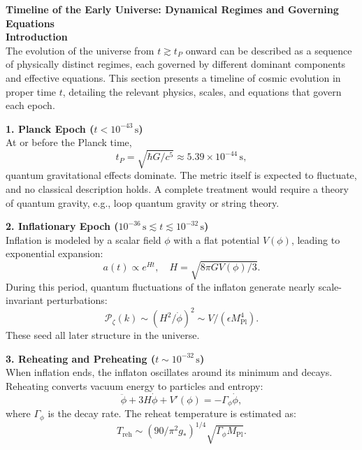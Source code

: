 \begin{technical}
{\Large\textbf{Timeline of the Early Universe: Dynamical Regimes and Governing Equations}}\\[0.4em]

\noindent\textbf{Introduction}\\[0.3em]
The evolution of the universe from \( t \gtrsim t_P \) onward can be described as a sequence of physically distinct regimes, each governed by different dominant components and effective equations. This section presents a timeline of cosmic evolution in proper time \( t \), detailing the relevant physics, scales, and equations that govern each epoch.

\noindent\textbf{1. Planck Epoch \boldmath(\( t < 10^{-43} \, \text{s} \))}\\[0.3em]
At or before the Planck time,
\[
t_P = \sqrt{\hbar G/c^5} \approx 5.39 \times 10^{-44} \, \text{s},
\]
quantum gravitational effects dominate. The metric itself is expected to fluctuate, and no classical description holds. A complete treatment would require a theory of quantum gravity, e.g., loop quantum gravity or string theory.

\noindent\textbf{2. Inflationary Epoch \boldmath(\(10^{-36} \, \text{s} \lesssim t \lesssim 10^{-32} \, \text{s} \))}\\[0.3em]
Inflation is modeled by a scalar field \(\phi\) with a flat potential \(V(\phi)\), leading to exponential expansion:
\[
a(t) \propto e^{H t}, \quad H = \sqrt{8\pi G V(\phi)/3}.
\]
During this period, quantum fluctuations of the inflaton generate nearly scale-invariant perturbations:
\[
\mathcal{P}_\zeta(k) \sim (H^2/\dot{\phi})^2 \sim V/(\epsilon M_{\text{Pl}}^4).
\]
These seed all later structure in the universe.

\noindent\textbf{3. Reheating and Preheating \boldmath(\( t \sim 10^{-32} \, \text{s} \))}\\[0.3em]
When inflation ends, the inflaton oscillates around its minimum and decays. Reheating converts vacuum energy to particles and entropy:
\[
\ddot{\phi} + 3H\dot{\phi} + V'(\phi) = -\Gamma_\phi \dot{\phi},
\]
where \(\Gamma_\phi\) is the decay rate. The reheat temperature is estimated as:
\[
T_{\text{reh}} \sim (90/\pi^2 g_*)^{1/4} \sqrt{\Gamma_\phi M_{\text{Pl}}}.
\]


\end{technical}
